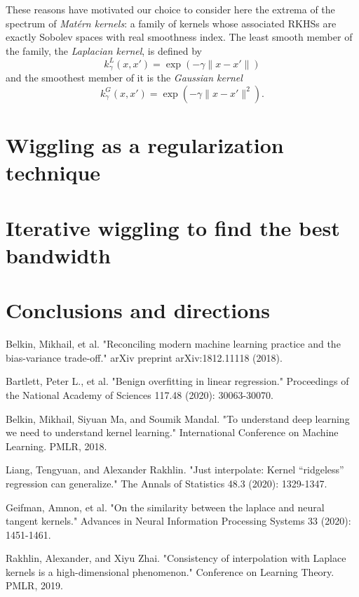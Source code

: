 \documentclass[12pt]{amsart}
\begin{document}
These reasons have motivated our choice to consider here the extrema of 
the spectrum of \emph{Matérn kernels}: a family of kernels whose associated
RKHSs are exactly Sobolev spaces with real smoothness index.
The least smooth member of the family, the \emph{Laplacian kernel}, is 
defined by
\[ k^L_\gamma(x,x') = \exp(-\gamma \| x - x' \|) \]
and the smoothest member of it is the \emph{Gaussian kernel}
\[ k^G_\gamma(x,x') = \exp(-\gamma \| x - x' \|^2). \]

\section{Wiggling as a regularization technique}

\section{Iterative wiggling to find the best bandwidth}

\section{Conclusions and directions}

\begin{thebibliography}{20}

Belkin, Mikhail, et al. "Reconciling modern machine learning practice and the bias-variance trade-off." arXiv preprint arXiv:1812.11118 (2018).

Bartlett, Peter L., et al. "Benign overfitting in linear regression." Proceedings of the National Academy of Sciences 117.48 (2020): 30063-30070.

Belkin, Mikhail, Siyuan Ma, and Soumik Mandal. "To understand deep learning we need to understand kernel learning." International Conference on Machine Learning. PMLR, 2018.

Liang, Tengyuan, and Alexander Rakhlin. "Just interpolate: Kernel “ridgeless” regression can generalize." The Annals of Statistics 48.3 (2020): 1329-1347.

Geifman, Amnon, et al. "On the similarity between the laplace and neural tangent kernels." Advances in Neural Information Processing Systems 33 (2020): 1451-1461.

Rakhlin, Alexander, and Xiyu Zhai. "Consistency of interpolation with Laplace kernels is a high-dimensional phenomenon." Conference on Learning Theory. PMLR, 2019.

\end{thebibliography}
\end{document}
